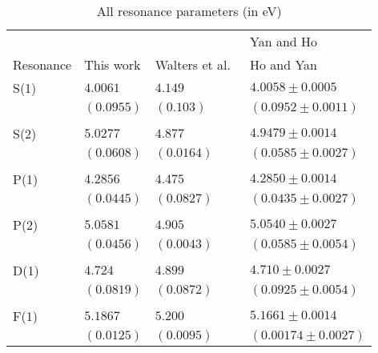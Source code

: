 \documentclass[Dissertation.tex]{subfiles}
\begin{document}
\setlength{\abovecaptionskip}{6pt}   %
\setlength{\belowcaptionskip}{6pt}   %
\begin{table}[H]
\centering
\begin{tabular}{l l l l}
\toprule
 & & & Yan and Ho \cite{Yan1999, Yan1998a} \\
Resonance & This work & Walters et al.\ \cite{Walters2004} & Ho and Yan \cite{Ho1998, Ho2000} \\
\midrule
S(1) & $4.0061$ & $4.149$ & $4.0058 \pm 0.0005$ \\
     & $(0.0955)$ & $(0.103)$ & $(0.0952 \pm 0.0011)$ \\
\\
S(2) & $5.0277$ & $4.877$ & $4.9479 \pm 0.0014$ \\
     & $(0.0608)$ & $(0.0164)$ & $(0.0585 \pm 0.0027)$ \\
\\
P(1) & $4.2856$ & $4.475$ & $4.2850 \pm 0.0014$ \\
     & $(0.0445)$ & $(0.0827)$ & $(0.0435 \pm 0.0027)$ \\
\\
P(2) & $5.0581$ & $4.905$ & $5.0540 \pm 0.0027$ \\
     & $(0.0456)$ & $(0.0043)$ & $(0.0585 \pm 0.0054)$ \\
\\
D(1) & $4.724$ & $4.899$ & $4.710 \pm 0.0027$ \\
     & $(0.0819)$ & $(0.0872)$ & $(0.0925 \pm 0.0054)$ \\
\\
F(1) & $5.1867$ & $5.200$ & $5.1661 \pm 0.0014$ \\
     & $(0.0125)$ & $(0.0095)$ & $(0.00174 \pm 0.0027)$ \\
\bottomrule
\end{tabular}
\caption{All resonance parameters (in eV)}
\label{tab:AllResonanceComparisons}
\end{table}



\biblio
\end{document}
